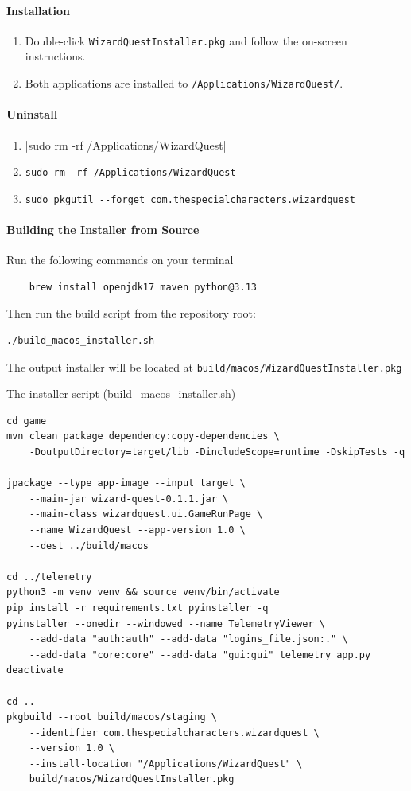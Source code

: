 \documentclass[11pt]{article}
\begin{document}
\paragraph{Installation}
\begin{enumerate}
    \item Double-click \verb|WizardQuestInstaller.pkg| and follow the on-screen instructions.
    \item Both applications are installed to \verb|/Applications/WizardQuest/|.
\end{enumerate}

\paragraph{Uninstall}
\begin{enumerate}
    \item |sudo rm -rf /Applications/WizardQuest|
    \item \verb|sudo rm -rf /Applications/WizardQuest|
    \item \verb|sudo pkgutil --forget com.thespecialcharacters.wizardquest|
\end{enumerate}

\paragraph{Building the Installer from Source}
Run the following commands on your terminal
\begin{verbatim}
    brew install openjdk17 maven python@3.13
\end{verbatim}
Then run the build script from the repository root:
\begin{verbatim}
./build_macos_installer.sh
\end{verbatim}
The output installer will be located at \verb|build/macos/WizardQuestInstaller.pkg|

The installer script (build_macos_installer.sh)
\begin{verbatim}
cd game
mvn clean package dependency:copy-dependencies \
    -DoutputDirectory=target/lib -DincludeScope=runtime -DskipTests -q

jpackage --type app-image --input target \
    --main-jar wizard-quest-0.1.1.jar \
    --main-class wizardquest.ui.GameRunPage \
    --name WizardQuest --app-version 1.0 \
    --dest ../build/macos

cd ../telemetry
python3 -m venv venv && source venv/bin/activate
pip install -r requirements.txt pyinstaller -q
pyinstaller --onedir --windowed --name TelemetryViewer \
    --add-data "auth:auth" --add-data "logins_file.json:." \
    --add-data "core:core" --add-data "gui:gui" telemetry_app.py
deactivate

cd ..
pkgbuild --root build/macos/staging \
    --identifier com.thespecialcharacters.wizardquest \
    --version 1.0 \
    --install-location "/Applications/WizardQuest" \
    build/macos/WizardQuestInstaller.pkg
\end{verbatim}
\end{document}
